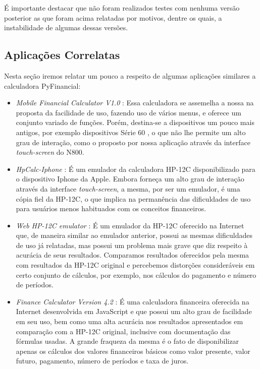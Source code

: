 É importante destacar que não foram realizados testes com nenhuma versão posterior as que foram acima relatadas por motivos, dentre os quais, a instabilidade de algumas dessas versões.


\subsection{Aplicações Correlatas}


Nesta seção iremos relatar um pouco a respeito de algumas aplicações similares a calculadora PyFinancial:

\begin{itemize}

 \item \textit{Mobile Financial Calculator V1.0} \cite{mobcalc}: Essa calculadora se assemelha a nossa na proposta da facilidade de uso, fazendo uso de vários menus, e oferece um conjunto variado de funções. Porém, destina-se a dispositivos um pouco mais antigos, por exemplo dispositivos Série 60 \cite{s60}, o que não lhe permite um alto grau de interação, como o proposto por nossa aplicação através da interface \textit{touch-screen} do N800.

 \item \textit{HpCalc-Iphone} \cite{hpiphone}: É um emulador da calculadora HP-12C disponibilizado para o dispositivo Iphone da Apple. Embora forneça um alto grau de interação através da interface \textit{touch-screen}, a mesma, por ser um emulador, é uma cópia fiel da HP-12C, o que implica na permanência das dificuldades de uso para usuários menos habituados com os conceitos financeiros.

 \item \textit{Web HP-12C emulator} \cite{epxcalc}: É um emulador da HP-12C oferecido na Internet que, de maneira similar ao emulador anterior, possui as mesmas dificuldades de uso já relatadas, mas possui um problema mais grave que diz respeito à acurácia de seus resultados. Comparamos resultados oferecidos pela mesma com resultados da HP-12C original e percebemos distorções consideráveis em certo conjunto de cálculos, por exemplo, nos cálculos do pagamento e número de períodos.

 \item \textit{Finance Calculator Version 4.2} \cite{arachnoid}: É uma calculadora financeira oferecida na Internet desenvolvida em JavaScript e que possui um alto grau de facilidade em seu uso, bem como uma alta acurácia nos resultados apresentados em comparação com a HP-12C original, inclusive com documentação das fórmulas usadas. A grande fraqueza da mesma é o fato de disponibilizar apenas os cálculos dos valores financeiros básicos como valor presente, valor futuro, pagamento, número de períodos e taxa de juros.

\end{itemize}

